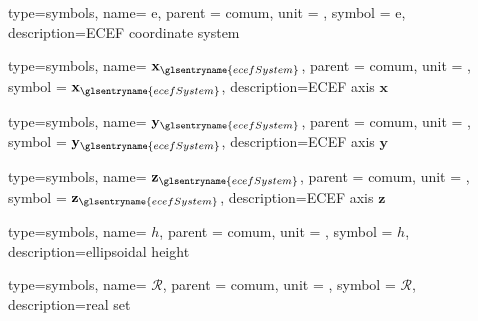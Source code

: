 
{type=symbols,
	name= \ensuremath{\mathrm{e}},
	parent = {comum},
	unit = \unexpanded{},
	symbol = \ensuremath{\mathrm{e}},
	description={ECEF coordinate system}
}

{type=symbols,
name= \ensuremath{\mathbf{x}_{\glsentryname{ecefSystem}}},
parent = {comum},
unit = \unexpanded{},
symbol = \ensuremath{\mathbf{x}_{\glsentryname{ecefSystem}}},
description={ECEF axis $\mathbf{x}$}
}

{type=symbols,
name= \ensuremath{\mathbf{y}_{\glsentryname{ecefSystem}}},
parent = {comum},
unit = \unexpanded{},
symbol = \ensuremath{\mathbf{y}_{\glsentryname{ecefSystem}}},
description={ECEF axis $\mathbf{y}$}
}

{type=symbols,
name= \ensuremath{\mathbf{z}_{\glsentryname{ecefSystem}}},
parent = {comum},
unit = \unexpanded{},
symbol = \ensuremath{\mathbf{z}_{\glsentryname{ecefSystem}}},
description={ECEF axis $\mathbf{z}$}
}


{type=symbols,
	name= \ensuremath{h},
	parent = {comum},
	unit = \unexpanded{\si{\meter}},
	symbol = \ensuremath{h},
	description={ellipsoidal height}
}

{type=symbols,
	name= \ensuremath{\mathcal{R}},
	parent = {comum},
	unit = \unexpanded{},
	symbol = \ensuremath{\mathcal{R}},
	description={real set}
}